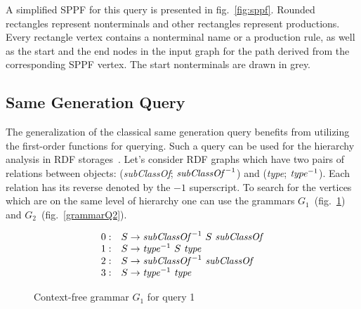 A simplified SPPF for this query is presented in fig.~\ref{fig:sppf}. Rounded rectangles represent nonterminals and other rectangles represent productions.
Every rectangle vertex contains a nonterminal name or a production rule, as well as the start and the end nodes in the input graph for the path derived from the corresponding SPPF vertex.
The start nonterminals are drawn in grey.

\subsection{Same Generation Query}

The generalization of the classical same generation query benefits from utilizing the first-order functions for querying. 
Such a query can be used for the hierarchy analysis in RDF storages~\cite{CFGonRDF}.
Let's consider RDF graphs which have two pairs of relations between objects: (\emph{subClassOf}; $\text{\emph{subClassOf}}^{-1}$) and (\emph{type}; $\text{\emph{type}}^{-1}$). Each relation has its reverse denoted by the $-1$ superscript. 
To search for the vertices which are on the same level of hierarchy one can use the grammars $G_1$~(fig.~\ref{grammarQ1}) and $G_2$~(fig.~\ref{grammarQ2}).

%

\begin{figure}[h]
   \centering
   \[
\begin{array}{rl}
   0: & S \rightarrow \text{\textit{subClassOf}}^{-1} \ S \ \text{\textit{subClassOf}} \\
   1: & S \rightarrow \text{\textit{type}}^{-1} \ S \ \text{\textit{type}} \\
   2: & S \rightarrow \text{\textit{subClassOf}}^{-1} \ \text{\textit{subClassOf}} \\
   3: & S \rightarrow \text{\textit{type}}^{-1} \ \text{\textit{type}} \\
\end{array}
\]
   \caption{Context-free grammar $G_1$ for query 1}
   \label{grammarQ1}
   \end{figure}


